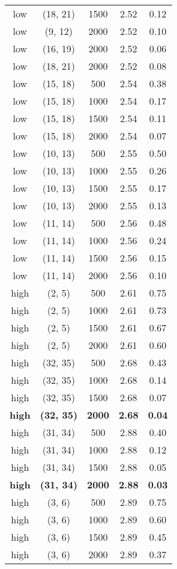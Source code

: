 \begin{tabular}{c c c c c}
low & (18, 21) &  1500 & 2.52 & 0.12 \\
low & (9, 12) &  2000 & 2.52 & 0.10 \\
low & (16, 19) &  2000 & 2.52 & 0.06 \\
low & (18, 21) &  2000 & 2.52 & 0.08 \\
low & (15, 18) &  500 & 2.54 & 0.38 \\
low & (15, 18) &  1000 & 2.54 & 0.17 \\
low & (15, 18) &  1500 & 2.54 & 0.11 \\
low & (15, 18) &  2000 & 2.54 & 0.07 \\
low & (10, 13) &  500 & 2.55 & 0.50 \\
low & (10, 13) &  1000 & 2.55 & 0.26 \\
low & (10, 13) &  1500 & 2.55 & 0.17 \\
low & (10, 13) &  2000 & 2.55 & 0.13 \\
low & (11, 14) &  500 & 2.56 & 0.48 \\
low & (11, 14) &  1000 & 2.56 & 0.24 \\
low & (11, 14) &  1500 & 2.56 & 0.15 \\
low & (11, 14) &  2000 & 2.56 & 0.10 \\
high & (2, 5) &  500 & 2.61 & 0.75 \\
high & (2, 5) &  1000 & 2.61 & 0.73 \\
high & (2, 5) &  1500 & 2.61 & 0.67 \\
high & (2, 5) &  2000 & 2.61 & 0.60 \\
high & (32, 35) &  500 & 2.68 & 0.43 \\
high & (32, 35) &  1000 & 2.68 & 0.14 \\
high & (32, 35) &  1500 & 2.68 & 0.07 \\
\textbf{high} & \textbf{(32, 35)} & \textbf{ 2000} & \textbf{2.68} & \textbf{0.04} \\
high & (31, 34) &  500 & 2.88 & 0.40 \\
high & (31, 34) &  1000 & 2.88 & 0.12 \\
high & (31, 34) &  1500 & 2.88 & 0.05 \\
\textbf{high} & \textbf{(31, 34)} & \textbf{ 2000} & \textbf{2.88} & \textbf{0.03} \\
high & (3, 6) &  500 & 2.89 & 0.75 \\
high & (3, 6) &  1000 & 2.89 & 0.60 \\
high & (3, 6) &  1500 & 2.89 & 0.45 \\
high & (3, 6) &  2000 & 2.89 & 0.37 \\

\end{tabular}
